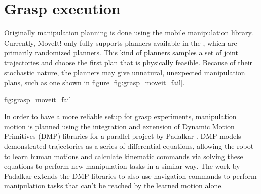 \section{Grasp execution}

Originally manipulation planning is done using the  mobile manipulation
library. Currently, MoveIt! only fully supports planners available in the , which are primarily randomized planners. This kind of planners samples a set of
joint trajectories and choose the first plan that is physically feasible. Because of their stochastic nature, the
planners may give unnatural, unexpected manipulation plans, such as one shown in figure \ref{fig:grasp_moveit_fail}.

             {fig:grasp_moveit_fail}{\textwidth}

In order to have a more reliable setup for grasp experiments, manipulation motion is planned using the integration and
extension of Dynamic Motion Primitives (DMP) libraries for a parallel project by Padalkar \cite{Padalkar2018}. DMP
models demonstrated trajectories as a series of differential equations, allowing the robot to learn human motions and
calculate kinematic commands via solving these equations to perform new manipulation tasks in a similar way. The work
by Padalkar extends the DMP libraries to also use navigation commands to perform manipulation tasks that can't be
reached by the learned motion alone.
